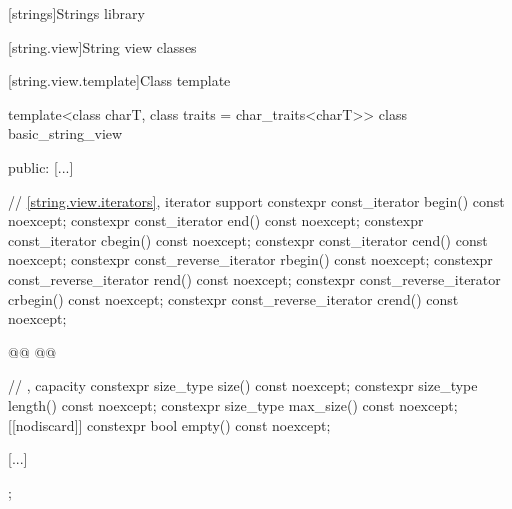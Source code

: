 
\setcounter{chapter}{24}
[strings]{Strings library}

\setcounter{section}{3}
[string.view]{String view classes}

\setcounter{subsection}{1}
[string.view.template]{Class template }

%
%
%
%
%
%
%
%
%
%
%
%
%
\begin{codeblock}
template<class charT, class traits = char_traits<charT>>
class basic_string_view {
public:
  [...]

  // \ref{string.view.iterators}, iterator support
  constexpr const_iterator begin() const noexcept;
  constexpr const_iterator end() const noexcept;
  constexpr const_iterator cbegin() const noexcept;
  constexpr const_iterator cend() const noexcept;
  constexpr const_reverse_iterator rbegin() const noexcept;
  constexpr const_reverse_iterator rend() const noexcept;
  constexpr const_reverse_iterator crbegin() const noexcept;
  constexpr const_reverse_iterator crend() const noexcept;

  @@
  @@

  // , capacity
  constexpr size_type size() const noexcept;
  constexpr size_type length() const noexcept;
  constexpr size_type max_size() const noexcept;
  [[nodiscard]] constexpr bool empty() const noexcept;

  [...]
};
\end{codeblock}


